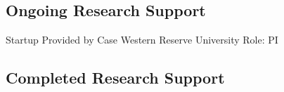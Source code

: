 \documentclass{nihbiosketch}
\begin{document}
\subsection*{Ongoing Research Support}

{Startup}
{Provided by Case Western Reserve University}
{Role: PI}




\subsection*{Completed Research Support}
%
\end{document}
